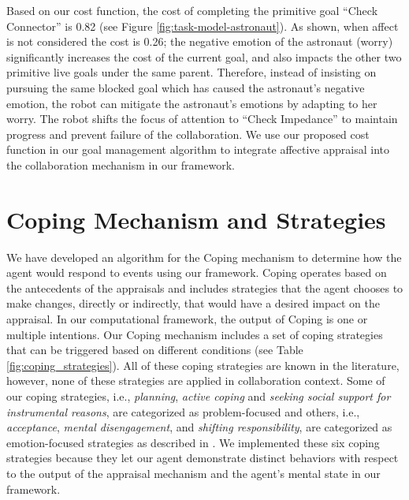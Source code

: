 \documentclass[12pt]{report}
\begin{document}
Based on our cost function, the cost of completing the primitive goal ``Check
Connector'' is 0.82 (see Figure \ref{fig:task-model-astronaut}). As shown, when
affect is not considered the cost is 0.26; the negative emotion of the astronaut
(worry) significantly increases the cost of the current goal, and also impacts
the other two primitive live goals under the same parent. Therefore, instead of
insisting on pursuing the same blocked goal which has caused the astronaut's
negative emotion, the robot can mitigate the astronaut's emotions by adapting to
her worry. The robot shifts the focus of attention to ``Check Impedance'' to
maintain progress and prevent failure of the collaboration. We use our proposed
cost function in our goal management algorithm to integrate affective appraisal
into the collaboration mechanism in our framework.

\section{Coping Mechanism and Strategies}
\label{sec:coping-mechanism}
We have developed an algorithm for the Coping mechanism to determine how the
agent would respond to events using our framework. Coping operates
based on the antecedents of the appraisals and includes strategies that the
agent chooses to make changes, directly or indirectly, that would have a desired
impact on the appraisal. In our computational framework, the output of Coping is
one or multiple intentions. Our Coping mechanism includes
a set of coping strategies that can be triggered based on different conditions
(see Table \ref{fig:coping_strategies}). All of these coping strategies are
known in the literature, however, none of these strategies are applied in
collaboration context. Some of our coping strategies, i.e., \textit{planning},
\textit{active coping} and \textit{seeking social support for instrumental
reasons}, are categorized as problem-focused and others, i.e.,
\textit{acceptance}, \textit{mental disengagement}, and \textit{shifting
responsibility}, are categorized as emotion-focused strategies as described in
\cite{gratch:domain-independent}. We implemented these six coping strategies
because they let our agent demonstrate distinct behaviors with respect to the
output of the appraisal mechanism and the agent's mental state in our framework.
\end{document}
